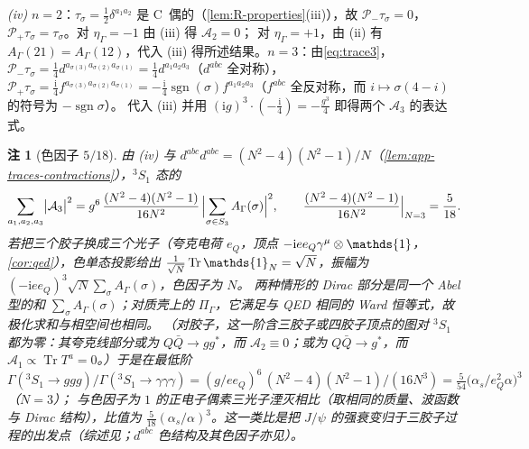 \documentclass[UTF8,a4paper,11pt,fontset=fandol]{ctexart}
\makeatletter
\let\amsmathbb\mathbb
\renewcommand{\mathbb}[1]{\ifx1#1\mathds{1}\else\amsmathbb{#1}\fi}
\theoremstyle{cplain}
\theoremstyle{cdefinition}
\theoremstyle{cremark}
\newtheorem{remark}[theorem]{注}
\renewcommand{\proofname}{证明}
\renewenvironment{proof}[1][\proofname]{\par\pushQED{\qed}\normalfont\topsep6\p@\@plus6\p@\relax
  \trivlist\item[\hskip\labelsep\itshape #1\hspace{0.5em}]\ignorespaces}{\popQED\endtrivlist\@endpefalse}
\numberwithin{equation}{section}
\DeclareMathOperator{\Tr}{Tr}
\newcommand{\Pp}{\mathcal{P}_{+}}                    %
\newcommand{\Pm}{\mathcal{P}_{-}}                    %
\newcommand{\ii}{\mathrm{i}}                        %
\makeatother
\begin{document}
\begin{proof}
\emph{(iv)} $n=2$：$\tau_\sigma=\frac12\delta^{a_1a_2}$ 是 C~偶的（\cref{lem:R-properties}(iii)），故 $\Pm\tau_\sigma=0$，$\Pp\tau_\sigma=\tau_\sigma$。对 $\eta_\Gamma=-1$ 由 (iii) 得 $\mathcal A_2=0$；
对 $\eta_\Gamma=+1$，由 (ii) 有 $A_\Gamma(21)=A_\Gamma(12)$，代入 (iii) 得所述结果。$n=3$：由\cref{eq:trace3}，$\Pm\tau_\sigma=\frac14d^{a_{\sigma(3)}a_{\sigma(2)}a_{\sigma(1)}}=\frac14d^{a_1a_2a_3}$（$d^{abc}$ 全对称），
$\Pp\tau_\sigma=\frac{\ii}{4}f^{a_{\sigma(3)}a_{\sigma(2)}a_{\sigma(1)}}=-\frac{\ii}{4}\operatorname{sgn}(\sigma)f^{a_1a_2a_3}$（$f^{abc}$ 全反对称，而 $i\mapsto\sigma(4-i)$ 的符号为 $-\operatorname{sgn}\sigma$）。
代入 (iii) 并用 $(\ii g)^3\cdot(-\frac{\ii}{4})=-\frac{g^3}{4}$ 即得两个 $\mathcal A_3$ 的表达式。
\end{proof}

\begin{remark}[色因子 $5/18$]\label{rem:app-onium-colour}
由 (iv) 与 $d^{abc}d^{abc}=(N^2-4)(N^2-1)/N$（\cref{lem:app-traces-contractions}），${}^3S_1$ 态的
\begin{equation}\label{eq:app-onium-colour}
\sum_{a_1,a_2,a_3}\bigl|\mathcal A_3\bigr|^2=g^6\,\frac{(N^2-4)(N^2-1)}{16N^2}\,\Bigl|\sum_{\sigma\in S_3}A_\Gamma(\sigma)\Bigr|^2,\qquad \frac{(N^2-4)(N^2-1)}{16N^2}\Big|_{N=3}=\frac{5}{18}.
\end{equation}
若把三个胶子换成三个光子（夸克电荷 $e_Q$，顶点 $-\ii ee_Q\gamma^\mu\otimes\mathbb 1$，\cref{cor:qed}），色单态投影给出 $\frac1{\sqrt N}\Tr\mathbb 1_N=\sqrt N$，振幅为 $(-\ii ee_Q)^3\sqrt N\sum_\sigma A_\Gamma(\sigma)$，色因子为 $N$。
两种情形的 Dirac 部分是同一个 Abel 型的和 $\sum_{\sigma}A_\Gamma(\sigma)$；对质壳上的 $\Pi_\Gamma$，它满足与 QED 相同的 Ward 恒等式，故极化求和与相空间也相同。
（对胶子，这一阶含三胶子或四胶子顶点的图对 ${}^3S_1$ 都为零：其夸克线部分或为 $Q\bar Q\to gg^*$，而 $\mathcal A_2\equiv0$；或为 $Q\bar Q\to g^*$，而 $\mathcal A_1\propto\Tr T^a=0$。）于是在最低阶
$\varGamma({}^3S_1\to ggg)/\varGamma({}^3S_1\to\gamma\gamma\gamma)=(g/ee_Q)^6\,(N^2-4)(N^2-1)/(16N^3)=\frac{5}{54}\bigl(\alpha_s/e_Q^2\alpha\bigr)^3$（$N=3$）；
与色因子为 $1$ 的正电子偶素三光子湮灭\cite{OrePowell1949}相比（取相同的质量、波函数与 Dirac 结构），比值为 $\frac{5}{18}(\alpha_s/\alpha)^3$。这一类比是把 $J/\psi$ 的强衰变归于三胶子过程的出发点\cite{AppelquistPolitzer1975PRL,AppelquistPolitzer1975PRD}（综述见\cite{Novikov1978}；$d^{abc}$ 色结构及其色因子亦见\cite{Jia2007}）。
\end{remark}
\end{document}

